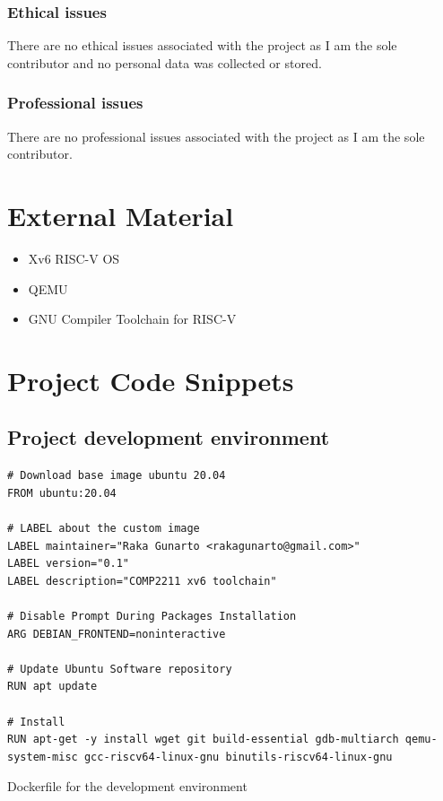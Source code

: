 \begin{appendices}
\subsection{Ethical issues}
There are no ethical issues associated with the project as I am the sole contributor
and no personal data was collected or stored.
\subsection{Professional issues}
There are no professional issues associated with the project as I am the sole contributor.

%
%
\chapter{External Material}
\begin{itemize}
    \item Xv6 RISC-V OS
    \item QEMU
    \item GNU Compiler Toolchain for RISC-V
\end{itemize}



%
%

\chapter{Project Code Snippets}
\section{Project development environment}
\label{appendix:c:1}
\begin{listing}[H]
    \begin{verbatim}
# Download base image ubuntu 20.04
FROM ubuntu:20.04

# LABEL about the custom image
LABEL maintainer="Raka Gunarto <rakagunarto@gmail.com>"
LABEL version="0.1"
LABEL description="COMP2211 xv6 toolchain"

# Disable Prompt During Packages Installation
ARG DEBIAN_FRONTEND=noninteractive

# Update Ubuntu Software repository
RUN apt update

# Install
RUN apt-get -y install wget git build-essential gdb-multiarch qemu-system-misc gcc-riscv64-linux-gnu binutils-riscv64-linux-gnu
    \end{verbatim}
    \caption{Dockerfile for the development environment}
\end{listing}

\end{appendices}
